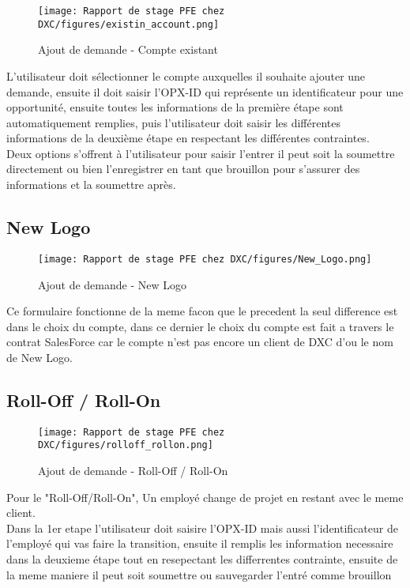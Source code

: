 \begin{figure}[!h]
    \centering
    \texttt{[image: Rapport de stage PFE chez DXC/figures/existin\_account.png]}
    \caption{Ajout de demande - Compte existant}
\end{figure}

L'utilisateur doit sélectionner le compte auxquelles il souhaite ajouter une demande, ensuite il doit saisir l'OPX-ID qui représente un identificateur pour une opportunité, ensuite toutes les informations de la première étape sont automatiquement remplies, puis l'utilisateur doit saisir les différentes informations de la deuxième étape en respectant les différentes contraintes. 
\\[0.3cm]
Deux options s’offrent à l'utilisateur pour saisir l’entrer il peut soit la soumettre directement ou bien l'enregistrer en tant que brouillon pour s'assurer des informations et la soumettre après.

\newpage
\subsection{New Logo}

\begin{figure}[!h]
    \centering
    \texttt{[image: Rapport de stage PFE chez DXC/figures/New\_Logo.png]}
    \caption{Ajout de demande - New Logo}
\end{figure}

Ce formulaire fonctionne de la meme facon que le precedent la seul difference est dans le choix du compte, dans ce dernier le choix du compte est fait a travers le contrat SalesForce car le compte n'est pas encore un client de DXC d'ou le nom de New Logo.

\subsection{Roll-Off / Roll-On}

\begin{figure}[H]
    \centering
    \texttt{[image: Rapport de stage PFE chez DXC/figures/rolloff\_rollon.png]}
    \caption{Ajout de demande - Roll-Off / Roll-On}
\end{figure}

Pour le "Roll-Off/Roll-On", Un employé change de projet en restant avec le meme client.
\\
Dans la 1er etape l'utilisateur doit saisire l'OPX-ID mais aussi l'identificateur de l'employé qui vas faire la transition, ensuite il remplis les information necessaire dans la deuxieme étape tout en resepectant les differrentes contrainte, ensuite de la meme maniere il peut soit soumettre ou sauvegarder l'entré comme brouillon

